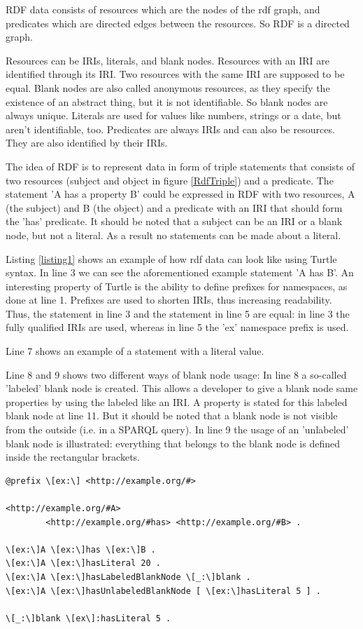 RDF data consists of resources which are the nodes of the rdf graph, and predicates which are directed edges between the resources. So RDF is a directed graph. 

Resources can be IRIs, literals, and blank nodes. 
Resources with an IRI are identified through its IRI. Two resources with the same IRI are supposed to be equal.
Blank nodes are also called anonymous resources, as they specify the existence of an abstract thing, but it is not identifiable. So blank nodes are always unique.
Literals are used for values like numbers, strings or a date, but aren't identifiable, too.
Predicates are always IRIs and can also be resources. They are also identified by their IRIs.

The idea of RDF is to represent data in form of triple statements that consists of two resources (subject and object in figure \ref{RdfTriple}) and a predicate. The statement 'A has a property B' could be expressed in RDF with two resources, A (the subject) and B (the object) and a predicate with an IRI that should form the 'has' predicate. It should be noted that a subject can be an IRI or a blank node, but not a literal. As a result no statements can be made about a literal.

Listing \ref{listing1} shows an example of how rdf data can look like using Turtle syntax. In line 3 we can see the aforementioned example statement 'A has B'. An interesting property of Turtle is the ability to define prefixes for namespaces, as done at line 1. Prefixes are used to shorten IRIs, thus increasing readability. Thus, the statement in line 3 and the statement in line 5 are equal: in line 3 the fully qualified IRIs are used, whereas in line 5 the 'ex' namespace prefix is used.

Line 7 shows an example of a statement with a literal value.

Line 8 and 9 shows two different ways of blank node usage: In line 8 a so-called 'labeled' blank node is created. This allows a developer to give a blank node same properties by using the labeled like an IRI. A property is stated for this labeled blank node at line 11.
But it should be noted that a blank node is not visible from the outside (i.e. in a SPARQL query).
In line 9 the usage of an 'unlabeled' blank node is illustrated: everything that belongs to the blank node is defined inside the rectangular brackets. \\

\begin{lstlisting}[style=RdfCodeStyle, caption=RDF example data in Turtle syntax, label=listing1]
@prefix \[ex:\] <http://example.org/#>

<http://example.org/#A> 
		<http://example.org/#has> <http://example.org/#B> .

\[ex:\]A \[ex:\]has \[ex:\]B .
\[ex:\]A \[ex:\]hasLiteral 20 .
\[ex:\]A \[ex:\]hasLabeledBlankNode \[_:\]blank .
\[ex:\]A \[ex:\]hasUnlabeledBlankNode [ \[ex:\]hasLiteral 5 ] .

\[_:\]blank \[ex\]:hasLiteral 5 .
\end{lstlisting}


